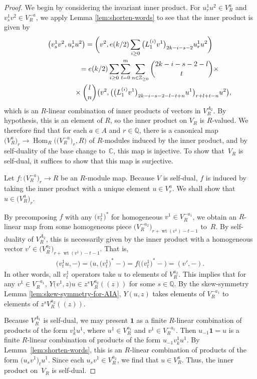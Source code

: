 \documentclass[11pt]{article}
\newcommand{\bC}{\mathbb{C}}
\newcommand{\bQ}{\mathbb{Q}}
\newcommand{\bZ}{\mathbb{Z}}
\newcommand{\unit}{\mathbf{1}}
\DeclareMathOperator{\Hom}{Hom}
\DeclareMathOperator{\wt}{wt}
\theoremstyle{definition}
\begin{document}
\begin{proof}
We begin by considering the invariant inner product. For $u^1_r u^2 \in V^a_R$ and $v^1_s v^2 \in V^{-a}_R$, we apply Lemma \ref{lem:shorten-words} to see that the inner product is given by
\begin{gather*}
\big(v^1_s v^2, u^1_r u^2\big) = \bigg(v^2, e(k/2) \sum_{i \geq 0} \big(L_1^{(i)} v^1\big)_{2k-i-s-2} u^1_r u^2\bigg) \\
\hphantom{\big(v^1_s v^2, u^1_r u^2\big)}{} = e(k/2) \sum_{i \geq 0} \sum_{t=0}^m \sum_{n \in \bZ_{\geq 0}} \binom{2k-i-s-2-l}{t} \times \\
\hphantom{\big(v^1_s v^2, u^1_r u^2\big)=}{} \times \binom{l}{n} \big(v^2, \big(\big(L_1^{(i)} v^1\big)_{2k-i-s-2-l-t+n}u^1\big)_{r+l+t-n} u^2\big),
\end{gather*}
which is an $R$-linear combination of inner products of vectors in $V^{A_2}_R$. By hypothesis, this is an element of $R$, so the inner product on $V_R$ is $R$-valued. We therefore find that for each $a \in A$ and $r \in \bQ$, there is a canonical map $\big(V^a_R\big)_r \to \Hom_R\big(\big(V^{-a}_R\big)_r, R\big)$ of $R$-modules induced by the inner product, and by self-duality of the base change to~$\bC$, this map is injective. To show that~$V_R$ is self-dual, it suffices to show that this map is surjective.

Let $f\colon \big(V^{-a}_R\big)_r \to R$ be an $R$-module map. Because $V$ is self-dual, $f$ is induced by taking the inner product with a unique element $u \in V^a_r$. We shall show that $u \in \big(V^a_R\big)_r$.

By precomposing $f$ with any $\big(v^1_t\big)^*$ for homogeneous $v^1 \in V^{-a_1}_R$, we obtain an $R$-linear map from some homogeneous piece $\big(V^{-a_2}_R\big)_{r+\wt(v^1)-t-1}$ to~$R$. By self-duality of $V^{A_2}_R$, this is necessarily given by the inner product with a homogeneous vector $v' \in \big(V^{a_2}_R\big)_{r+\wt(v^1)-t-1}$. That is,
\begin{gather*} \big(v^1_t u, -\big) = \big(u, \big(v^1_t\big)^* -\big) = f\big(\big(v^1_t\big)^* -\big) = (v',-). \end{gather*}
In other words, all $v^1_t$ operators take $u$ to elements of $V^{a_2}_R$. This implies that for any $v^1 \in V^{-a_1}_R$, $Y\big(v^1,z\big)u \in z^s V^{a_2}_R((z))$ for some $s \in \bQ$. By the skew-symmetry Lemma \ref{lem:skew-symmetry-for-AIA}, $Y(u,z)$ takes elements of $V^{-a_1}_R$ to elements of $z^sV^{a_2}_R((z))$.

Because $V^{A_1}_R$ is self-dual, we may present $\unit$ as a finite $R$-linear combination of products of the form $v^1_k u^1$, where $u^1 \in V^{a_1}_R$ and $v^1 \in V^{-a_1}_R$. Then $u_{-1} \unit = u$ is a finite $R$-linear combination of products of the form $u_{-1} v^1_k u^1$. By Lemma~\ref{lem:shorten-words}, this is an $R$-linear combination of products of the form $\big(u_s v^1\big)_t u^1$. Since each $u_s v^1 \in V^{a_2}_R$, we find that $u \in V^a_R$. Thus, the inner product on~$V_R$ is self-dual.


\end{proof}
\end{document}
